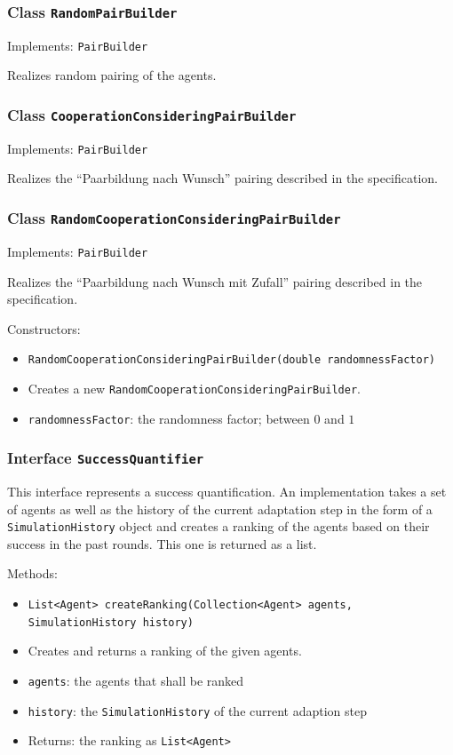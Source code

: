 \documentclass[parskip=full,11pt]{scrartcl}
\begin{document}
\subsubsection{Class \texttt{RandomPairBuilder}}
Implements: \texttt{PairBuilder}

Realizes random pairing of the agents.

\subsubsection{Class \texttt{CooperationConsideringPairBuilder}}
Implements: \texttt{PairBuilder}

Realizes the \enquote{Paarbildung nach Wunsch} pairing described in the specification.

\subsubsection{Class \texttt{RandomCooperationConsideringPairBuilder}}
Implements: \texttt{PairBuilder}

Realizes the \enquote{Paarbildung nach Wunsch mit Zufall} pairing described in the specification.


Constructors:
\begin{itemize}\itemsep -10pt
\item \texttt{RandomCooperationConsideringPairBuilder(double randomnessFactor)}
\item[] Creates a new \texttt{RandomCooperationConsideringPairBuilder}.
\item[] \texttt{randomnessFactor}: the randomness factor; between \(0\) and \(1\)
\end{itemize}

\subsubsection{Interface \texttt{SuccessQuantifier}}

This interface represents a success quantification. An implementation takes a set of agents as well as the history of the current adaptation step in the form of a \texttt{SimulationHistory} object and creates a ranking of the agents based on their success in the past rounds. This one is returned as a list.

Methods:
\begin{itemize}\itemsep -10pt
\item \texttt{List<Agent> createRanking(Collection<Agent> agents, SimulationHistory history)}
\item[] Creates and returns a ranking of the given agents.
\item[] \texttt{agents}: the agents that shall be ranked
\item[] \texttt{history}: the \texttt{SimulationHistory} of the current adaption step
\item[] Returns: the ranking as \texttt{List<Agent>}
\end{itemize}
\end{document}
